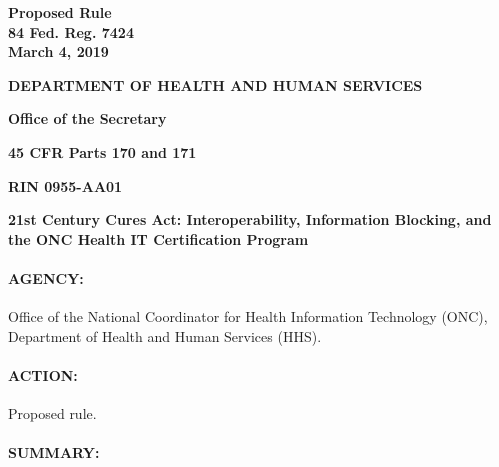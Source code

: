 \documentclass[twoside,11pt]{article}
\begin{document}
\thispagestyle{empty}
\begin{center}\bfseries Proposed Rule\\84 Fed. Reg. 7424\\March 4, 2019
\end{center}

        
           \ifhmode\expandafter\xspace\fi 
          \begin{center}
\bfseries
DEPARTMENT OF HEALTH AND HUMAN SERVICES\end{center}


          \begin{center}
\bfseries
Office of the Secretary\end{center}


          \begin{center}
\bfseries
45 CFR Parts 170 and 171\end{center}


          \begin{center}
\bfseries
RIN 0955-AA01\end{center}


          \begin{center}
\bfseries
21st Century Cures Act: Interoperability, Information Blocking, and the ONC Health IT Certification Program\end{center}


          
            \paragraph{AGENCY:}

            Office of the National Coordinator for Health Information Technology (ONC), Department of Health and Human Services (HHS).


          
          
            \paragraph{ACTION:}

            Proposed rule.


          
          
            \paragraph{SUMMARY:}
\end{document}
